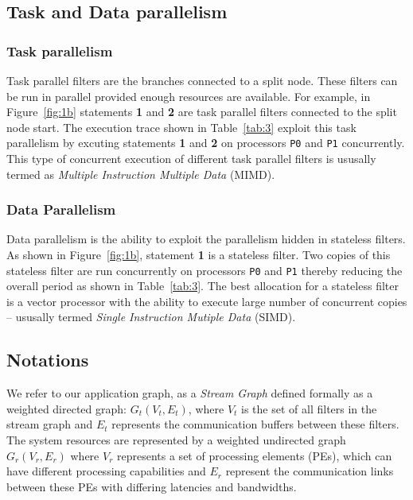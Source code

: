 \documentclass[10pt, conference, compsocconf, reqno]{IEEEtran}
\begin{document}
\subsection{Task and Data parallelism}

\subsubsection{Task parallelism}
Task parallel filters are the branches connected to a split node. These
filters can be run in parallel provided enough resources are available. For
example, in Figure~\ref{fig:1b} statements \textbf{1} and \textbf{2} are task
parallel filters connected to the split node start. The execution trace shown
in Table~\ref{tab:3} exploit this task parallelism by excuting statements
\textbf{1} and \textbf{2} on processors \texttt{P0} and \texttt{P1}
concurrently. This type of concurrent execution of different task parallel
filters is ususally termed as \textit{Multiple Instruction Multiple Data}
(MIMD).

\subsubsection{Data Parallelism}
Data parallelism is the ability to exploit the parallelism hidden in stateless
filters. As shown in Figure~\ref{fig:1b}, statement \textbf{1} is a stateless
filter. Two copies of this stateless filter are run concurrently on processors
\texttt{P0} and \texttt{P1} thereby reducing the overall period as shown in
Table~\ref{tab:3}. The best allocation for a stateless filter is a vector
processor with the ability to execute large number of concurrent copies --
ususally termed \textit{Single Instruction Mutiple Data} (SIMD).

\subsection{Notations}

We refer to our application graph, as a \textit{Stream Graph} defined
formally as a weighted directed graph: $G_t(V_t, E_t)$, where $V_t$ is
the set of all filters in the stream graph and $E_t$ represents the
communication buffers between these filters. The system resources are
represented by a weighted undirected graph $G_r(V_r, E_r)$ where $V_r$
represents a set of processing elements (PEs), which can have different
processing capabilities and $E_r$ represent the communication links
between these PEs with differing latencies and
bandwidths. %
\end{document}
